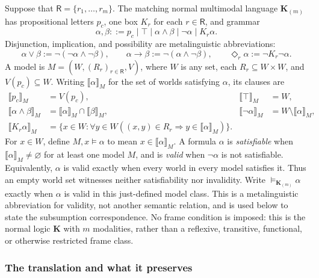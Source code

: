 Suppose that \(\mathsf R=\{r_1,\ldots,r_m\}\).  The matching normal
multimodal language \(\mathbf K_{(m)}\) has propositional letters \(p_c\),
one box \(K_r\) for each \(r\in\mathsf R\), and grammar
\[
 \alpha,\beta ::= p_c\mid\top\mid\alpha\land\beta
               \mid\neg\alpha\mid K_r\alpha.
\]
Disjunction, implication, and possibility are metalinguistic abbreviations:
\[
 \alpha\lor\beta:=\neg(\neg\alpha\land\neg\beta),
 \qquad
 \alpha\mathbin{\to}\beta:=\neg(\alpha\land\neg\beta),
 \qquad
 \Diamond_r\alpha:=\neg K_r\neg\alpha.
\]
A model is
\(M=(W,(R_r)_{r\in\mathsf R},V)\), where \(W\) is any set, each
\(R_r\subseteq W\times W\), and \(V(p_c)\subseteq W\).  Writing
\(\llbracket\alpha\rrbracket_M\) for the set of worlds satisfying
\(\alpha\), its clauses are
\[
\begin{aligned}
 \llbracket p_c\rrbracket_M&=V(p_c),
 &\llbracket\top\rrbracket_M&=W,\\
 \llbracket\alpha\land\beta\rrbracket_M
   &=\llbracket\alpha\rrbracket_M\cap\llbracket\beta\rrbracket_M,
 &\llbracket\neg\alpha\rrbracket_M
   &=W\setminus\llbracket\alpha\rrbracket_M,\\
 \llbracket K_r\alpha\rrbracket_M
   &=\{x\in W:\forall y\in W
       ((x,y)\in R_r\Rightarrow
        y\in\llbracket\alpha\rrbracket_M)\}.
\end{aligned}
\]
For \(x\in W\), define
\(M,x\models\alpha\) to mean
\(x\in\llbracket\alpha\rrbracket_M\).  A formula \(\alpha\) is
\emph{satisfiable} when
\(\llbracket\alpha\rrbracket_M\ne\varnothing\) for at least one model \(M\),
and is \emph{valid} when \(\neg\alpha\) is not satisfiable.  Equivalently,
\(\alpha\) is valid exactly when every world in every model satisfies it.
Thus an empty world set witnesses neither satisfiability nor invalidity.
Write \(\models_{\mathbf K_{(m)}}\alpha\) exactly when \(\alpha\) is valid in
this just-defined model class.  This is a metalinguistic abbreviation for
validity, not another semantic relation, and is used below to state the
subsumption correspondence.
No frame condition is imposed: this is the normal logic \(\mathbf K\) with
\(m\) modalities, rather than a reflexive, transitive, functional, or otherwise
restricted frame class.

\subsubsection{The translation and what it preserves}


